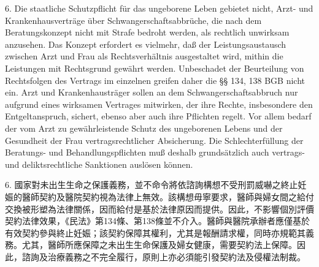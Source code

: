 \documentclass[12pt]{article}
\begin{document}
\begin{sourcepara}[title={原文D.149}]
6. Die staatliche Schutzpflicht für das ungeborene Leben gebietet nicht, Arzt- und Krankenhausverträge über Schwangerschaftsabbrüche, die nach dem Beratungskonzept nicht mit Strafe bedroht werden, als rechtlich unwirksam anzusehen. Das Konzept erfordert es vielmehr, daß der Leistungsaustausch zwischen Arzt und Frau als Rechtsverhältnis ausgestaltet wird, mithin die Leistungen mit Rechtsgrund gewährt werden. Unbeschadet der Beurteilung von Rechtsfolgen des Vertrags im einzelnen greifen daher die §§ 134, 138 BGB nicht ein. Arzt und Krankenhausträger sollen an dem Schwangerschaftsabbruch nur aufgrund eines wirksamen Vertrages mitwirken, der ihre Rechte, insbesondere den Entgeltanspruch, sichert, ebenso aber auch ihre Pflichten regelt. Vor allem bedarf der vom Arzt zu gewährleistende Schutz des ungeborenen Lebens und der Gesundheit der Frau vertragsrechtlicher Absicherung. Die Schlechterfüllung der Beratungs- und Behandlungspflichten muß deshalb grundsätzlich auch vertrags- und deliktsrechtliche Sanktionen auslösen können.
\end{sourcepara}
\begin{transpara}
6. 國家對未出生生命之保護義務，並不命令將依諮詢構想不受刑罰威嚇之終止妊娠的醫師契約及醫院契約視為法律上無效。該構想毋寧要求，醫師與婦女間之給付交換被形塑為法律關係，因而給付是基於法律原因而提供。因此，不影響個別評價契約法律效果，《民法》第134條、第138條並不介入。醫師與醫院承辦者應僅基於有效契約參與終止妊娠；該契約保障其權利，尤其是報酬請求權，同時亦規範其義務。尤其，醫師所應保障之未出生生命保護及婦女健康，需要契約法上保障。因此，諮詢及治療義務之不完全履行，原則上亦必須能引發契約法及侵權法制裁。
\end{transpara}
\end{document}
